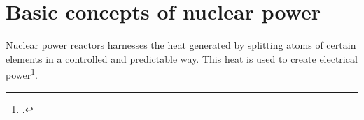 \chapter{Basic concepts of nuclear power}
Nuclear power reactors harnesses the heat generated by splitting atoms of certain
elements in a controlled and predictable way. This heat is used to create electrical power\footcite{WNPR}.
